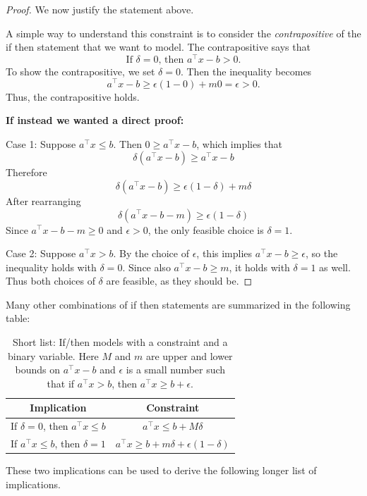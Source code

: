 \begin{proof}We now justify the statement above.

A simple way to understand this constraint is to consider the \emph{contrapositive} of the if then statement that we want to model.  The contrapositive says that 
\begin{equation}
\text{If $\delta = 0$, then $a^\top x - b > 0$.}
\end{equation}
To show the contrapositive, we set $\delta = 0$.  Then the inequality becomes 
$$
a^\top x - b \geq \epsilon(1-0) + m0 = \epsilon > 0.
$$
Thus, the contrapositive holds.

\textbf{If instead we wanted a direct proof:}

Case 1: Suppose $a^\top x \leq b$.  Then $0 \geq a^\top x - b$, which implies that 
$$
\delta(a^\top x - b) \geq a^\top x - b
$$
Therefore
$$
\delta(a^\top x - b) \geq \epsilon(1-\delta) + m \delta
$$
After rearranging
$$
\delta(a^\top x - b - m) \geq \epsilon(1-\delta)
$$
Since $a^\top x - b - m \geq 0$ and $\epsilon > 0$, the only feasible choice is $\delta = 1$.


Case 2:  Suppose $a^\top x > b$.  By the choice of $\epsilon$, this implies $a^\top x - b \geq \epsilon$, so the inequality holds with $\delta = 0$.  Since also $a^\top x - b \geq m$, it holds with $\delta = 1$ as well.  Thus both choices of $\delta$ are feasible, as they should be.
\end{proof}

Many other combinations of if then statements are summarized in the following table:
\begin{table}
\begin{center}
\begin{tabular}{|c|c|}
\hline
\textbf{Implication} & \textbf{Constraint}\\
\hline
If $\delta = 0$, then $a^\top x \leq b$ & $a^\top x \leq b + M \delta$\\
If $a^\top x \leq b$, then $\delta = 1$ & $a^\top x \geq b + m \delta + \epsilon(1-\delta)$\\
\hline
\end{tabular}
\end{center}
\caption{Short list: If/then models with a constraint and a binary variable.  Here $M$ and $m$ are upper and lower bounds on $a^\top x - b$ and $\epsilon$ is a small number such that if $a^\top x > b$, then $a^\top x \geq b + \epsilon$.}
\end{table}
These two implications can be used to derive the following longer list of implications.


